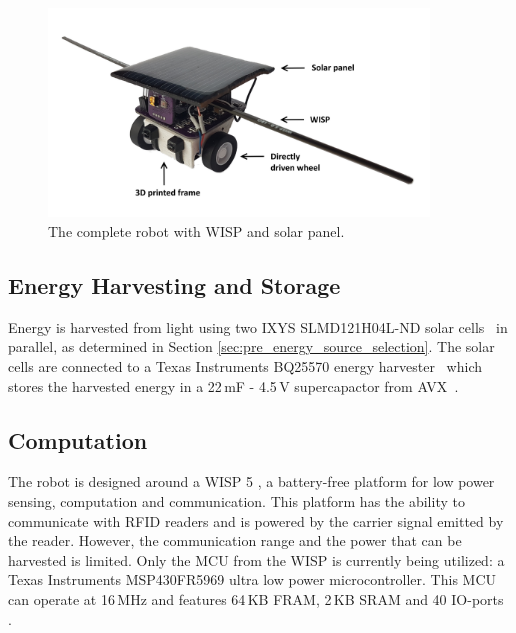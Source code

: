 \begin{figure}[h!]
	\centering
	\includegraphics[width=0.9\textwidth]{pics/tp_robot2.png}
	\caption{The complete robot with WISP and solar panel.}
	\label{fig:robot_picture}
\end{figure}

\subsection{Energy Harvesting and Storage}
Energy is harvested from light using two IXYS SLMD121H04L-ND solar cells~\cite{ixolar_slmd121h04l_2017} in parallel, as determined in Section \ref{sec:pre_energy_source_selection}.
The solar cells are connected to a Texas Instruments BQ25570 energy harvester~\cite{bq25570_2017} which stores the harvested energy in a 22\,mF - 4.5\,V supercapactor from AVX~\cite{avx_bestcap_2017}.

\subsection{Computation}
\label{sec:dai_computation}

The robot is designed around a WISP 5 \cite{wisp5_wiki_2017}, a battery-free platform for low power sensing, computation and communication.
This platform has the ability to communicate with RFID readers and is powered by the carrier signal emitted by the reader.
However, the communication range and the power that can be harvested is limited. 
Only the MCU from the WISP is currently being utilized: a Texas Instruments MSP430FR5969 ultra low power microcontroller.
This MCU can operate at 16\,MHz and features 64\,KB FRAM, 2\,KB SRAM and 40 IO-ports \cite{msp430fr5969_2017}.



